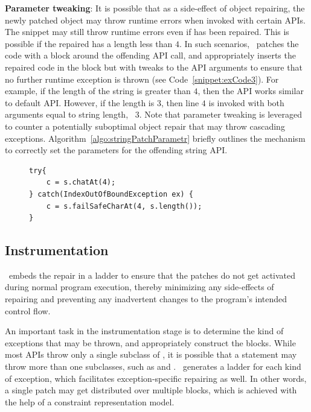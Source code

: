 \begin{mylist}
 \item \textbf{Parameter tweaking}: It is possible that as a side-effect of
object repairing, the newly patched object may throw runtime errors when invoked
with certain  APIs. The snippet  may still
throw runtime errors even if  has been repaired. This is possible if the
repaired  has a length less than $4$. In such scenarios, \tool\ patches
the code with a  block around the offending API call, and
appropriately inserts the repaired code in the  block but with
tweaks to the API arguments to ensure that no further runtime exception is
thrown (see Code~\ref{snippet:exCode3}). For example, if the length of the
string is greater than $4$, then the API works similar to default 
API. However, if the length is $3$, then line $4$ is invoked with both arguments
equal to string length, \ie\ $3$. Note that parameter tweaking is leveraged to
counter a potentially suboptimal object repair that may throw cascading
exceptions. Algorithm~\ref{algo:stringPatchParametr} briefly outlines the
mechanism to correctly set the parameters for the offending string API.

\lstset{language=Java, caption=Example of parameter tweaking.,
label = snippet:exCode3, firstnumber =1}
\begin{figure}[t]
\begin{lstlisting}
try{
    c = s.chatAt(4);
} catch(IndexOutOfBoundException ex) {
    c = s.failSafeCharAt(4, s.length());
}
\end{lstlisting}
\end{figure}
\end{mylist}


\subsection{Instrumentation}
\label{sec:tool:stage3}

\tool\ embeds the repair in a  ladder to ensure that the patches
do not get activated during normal program execution, thereby minimizing any
side-effects of repairing and preventing any inadvertent changes to the
program's intended control flow.

An important task in the instrumentation stage is to determine the kind of
exceptions that may be thrown, and appropriately construct the 
blocks. While most APIs throw only a single subclass of ,
it is possible that a statement may throw more than one subclasses, such as
 and . \tool\
generates a  ladder for each kind of exception, which facilitates
exception-specific repairing as well. In other words, a single patch
may get distributed over multiple \code{catch} blocks, which is achieved with
the help of a constraint representation model.



